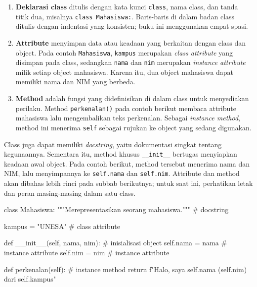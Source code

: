 \begin{enumerate}
  \item \textbf{Deklarasi class} ditulis dengan kata kunci \texttt{class}, nama class, dan tanda titik dua, misalnya \texttt{class Mahasiswa:}. Baris-baris di dalam badan class ditulis dengan indentasi yang konsisten; buku ini menggunakan empat spasi.
  \item \textbf{Attribute} menyimpan data atau keadaan yang berkaitan dengan class dan object. Pada contoh \texttt{Mahasiswa}, \texttt{kampus} merupakan \emph{class attribute} yang disimpan pada class, sedangkan \texttt{nama} dan \texttt{nim} merupakan \emph{instance attribute} milik setiap object mahasiswa. Karena itu, dua object mahasiswa dapat memiliki nama dan NIM yang berbeda.
  \item \textbf{Method} adalah fungsi yang didefinisikan di dalam class untuk menyediakan perilaku. Method \texttt{perkenalan()} pada contoh berikut membaca attribute mahasiswa lalu mengembalikan teks perkenalan. Sebagai \emph{instance method}, method ini menerima \texttt{self} sebagai rujukan ke object yang sedang digunakan.
\end{enumerate}

Class juga dapat memiliki \emph{docstring}, yaitu dokumentasi singkat tentang kegunaannya. Sementara itu, method khusus \texttt{\_\_init\_\_} bertugas menyiapkan keadaan awal object. Pada contoh berikut, method tersebut menerima nama dan NIM, lalu menyimpannya ke \texttt{self.nama} dan \texttt{self.nim}. Attribute dan method akan dibahas lebih rinci pada subbab berikutnya; untuk saat ini, perhatikan letak dan peran masing-masing dalam satu class.

\begin{kode}
class Mahasiswa:
    """Merepresentasikan seorang mahasiswa."""   # docstring

    kampus = "UNESA"                              # class attribute

    def __init__(self, nama, nim):                # inisialisasi object
        self.nama = nama                          # instance attribute
        self.nim = nim                            # instance attribute

    def perkenalan(self):                         # instance method
        return f"Halo, saya {self.nama} ({self.nim}) dari {self.kampus}"
\end{kode}

